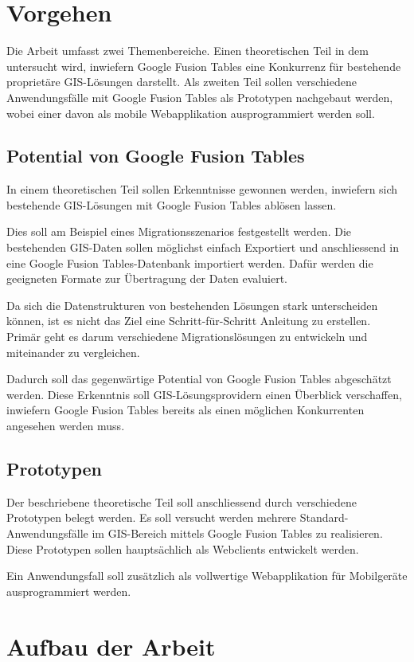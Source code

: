 \section{Vorgehen}
Die Arbeit umfasst zwei Themenbereiche. Einen theoretischen Teil in dem untersucht wird, inwiefern Google Fusion Tables eine Konkurrenz für bestehende proprietäre GIS-Lösungen darstellt. Als zweiten Teil sollen verschiedene Anwendungsfälle mit Google Fusion Tables als Prototypen nachgebaut werden, wobei einer davon als mobile Webapplikation ausprogrammiert werden soll.

\subsection{Potential von Google Fusion Tables}
In einem theoretischen Teil sollen Erkenntnisse gewonnen werden, inwiefern sich bestehende GIS-Lösungen mit Google Fusion Tables ablösen lassen.

Dies soll am Beispiel eines Migrationsszenarios festgestellt werden. Die bestehenden GIS-Daten sollen möglichst einfach Exportiert und anschliessend in eine Google Fusion Tables-Datenbank importiert werden. Dafür werden die geeigneten Formate zur Übertragung der Daten evaluiert.

Da sich die Datenstrukturen von bestehenden Lösungen stark unterscheiden können, ist es nicht das Ziel eine Schritt-für-Schritt Anleitung zu erstellen. Primär geht es darum verschiedene Migrationslösungen zu entwickeln und miteinander zu vergleichen.

Dadurch soll das gegenwärtige Potential von Google Fusion Tables abgeschätzt werden. Diese Erkenntnis soll GIS-Lösungsprovidern einen Überblick verschaffen, inwiefern Google Fusion Tables bereits als einen möglichen Konkurrenten angesehen werden muss.

\subsection{Prototypen}
Der beschriebene theoretische Teil soll anschliessend durch verschiedene Prototypen belegt werden. Es soll versucht werden mehrere Standard-Anwendungsfälle im GIS-Bereich mittels Google Fusion Tables zu realisieren. Diese Prototypen sollen hauptsächlich als Webclients entwickelt werden.

Ein Anwendungsfall soll zusätzlich als vollwertige Webapplikation für Mobilgeräte ausprogrammiert werden.

\section{Aufbau der Arbeit}

